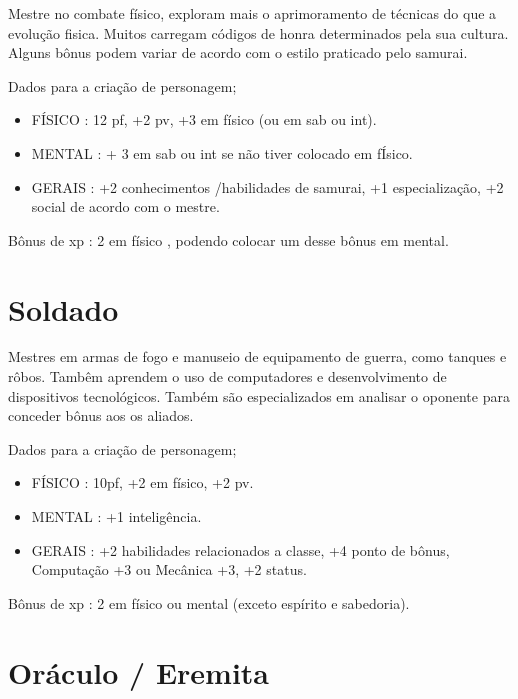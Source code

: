 Mestre no combate físico, exploram mais o aprimoramento de técnicas do que a evolução fisica. Muitos carregam códigos de honra determinados pela sua cultura. Alguns bônus podem variar de acordo com o estilo praticado pelo samurai.

Dados para a criação de personagem;

\begin{itemize}

	\item FÍSICO :  12 pf, +2 pv, +3 em físico (ou em sab ou int).

	\item MENTAL : + 3 em sab ou int se não tiver colocado em fÍsico.

	\item GERAIS : +2 conhecimentos /habilidades de samurai, +1 especialização, +2 social de acordo com o mestre.

\end{itemize}

Bônus de xp : 2 em físico , podendo colocar um desse bônus em mental.

\section{Soldado}

Mestres em armas de fogo e manuseio de equipamento de guerra, como tanques e rôbos. Tambêm aprendem o uso de computadores e desenvolvimento de dispositivos tecnológicos. Também são especializados em analisar o oponente para conceder bônus aos os aliados.

Dados para a criação de personagem;

\begin{itemize}


	\item FÍSICO : 10pf, +2 em físico, +2 pv.

	\item MENTAL : +1 inteligência.

	\item GERAIS : +2 habilidades relacionados a classe, +4 ponto de bônus, Computação +3 ou Mecânica +3, +2 status.

\end{itemize}

Bônus de xp : 2 em físico ou mental (exceto espírito e sabedoria).


\section{Oráculo / Eremita}


